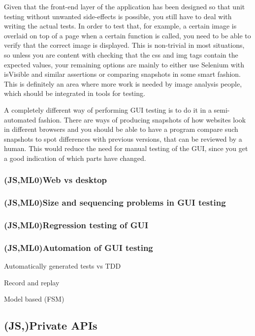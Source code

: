 \documentclass[11pt]{article}
\begin{document}
Given that the front-end layer of the application has been designed so that unit testing without unwanted side-effects is possible, you still have to deal with writing the actual tests. In order to test that, for example, a certain image is overlaid on top of a page when a certain function is called, you need to be able to verify that the correct image is displayed. This is non-trivial in most situations, so unless you are content with checking that the css and img tags contain the expected values, your remaining options are mainly to either use Selenium with isVisible and similar assertions or comparing snapshots in some smart fashion. This is definitely an area where more work is needed by image analysis people, which should be integrated in tools for testing.

A completely different way of performing GUI testing is to do it in a semi-automated fashion. There are ways of producing snapshots of how websites look in different browsers and you should be able to have a program compare such snapshots to spot differences with previous versions, that can be reviewed by a human. This would reduce the need for manual testing of the GUI, since you get a good indication of which parts have changed.

\subsubsection{(JS,ML0)Web vs desktop}

\subsubsection{(JS,ML0)Size and sequencing problems in GUI testing}

\subsubsection{(JS,ML0)Regression testing of GUI}

\subsubsection{(JS,ML0)Automation of GUI testing}

Automatically generated tests vs TDD

Record and replay

Model based (FSM)

\subsection{(JS,)Private APIs}
\end{document}
